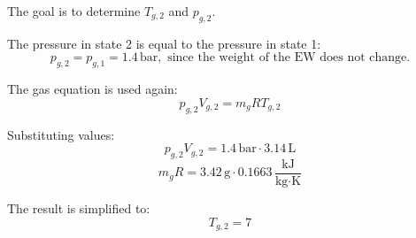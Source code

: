 The goal is to determine \( T_{g,2} \) and \( p_{g,2} \).  

The pressure in state 2 is equal to the pressure in state 1:  
\[
p_{g,2} = p_{g,1} = 1.4 \, \text{bar}, \text{ since the weight of the EW does not change.}
\]  

The gas equation is used again:  
\[
p_{g,2} V_{g,2} = m_g R T_{g,2}
\]  

Substituting values:  
\[
p_{g,2} V_{g,2} = 1.4 \, \text{bar} \cdot 3.14 \, \text{L}
\]  
\[
m_g R = 3.42 \, \text{g} \cdot 0.1663 \, \frac{\text{kJ}}{\text{kg·K}}
\]  

The result is simplified to:  
\[
T_{g,2} = 7
\]